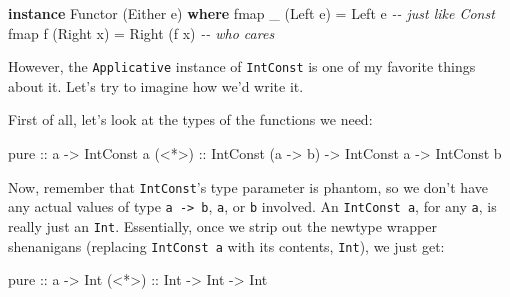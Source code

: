 \documentclass[]{article}
\newenvironment{Shaded}{}{}
\newcommand{\CommentTok}[1]{\textcolor[rgb]{0.38,0.63,0.69}{\textit{#1}}}
\newcommand{\DataTypeTok}[1]{\textcolor[rgb]{0.56,0.13,0.00}{#1}}
\newcommand{\FunctionTok}[1]{\textcolor[rgb]{0.02,0.16,0.49}{#1}}
\newcommand{\KeywordTok}[1]{\textcolor[rgb]{0.00,0.44,0.13}{\textbf{#1}}}
\newcommand{\NormalTok}[1]{#1}
\newcommand{\OtherTok}[1]{\textcolor[rgb]{0.00,0.44,0.13}{#1}}
\begin{document}
\begin{Shaded}
\begin{Highlighting}[]
\KeywordTok{instance} \DataTypeTok{Functor}\NormalTok{ (}\DataTypeTok{Either}\NormalTok{ e) }\KeywordTok{where}
    \FunctionTok{fmap}\NormalTok{ \_ (}\DataTypeTok{Left}\NormalTok{ e)  }\OtherTok{=} \DataTypeTok{Left}\NormalTok{ e        }\CommentTok{{-}{-} just like \textquotesingle{}Const\textquotesingle{}}
    \FunctionTok{fmap}\NormalTok{ f (}\DataTypeTok{Right}\NormalTok{ x) }\OtherTok{=} \DataTypeTok{Right}\NormalTok{ (f x)   }\CommentTok{{-}{-} who cares}
\end{Highlighting}
\end{Shaded}

However, the \texttt{Applicative} instance of \texttt{IntConst} is one of my
favorite things about it. Let's try to imagine how we'd write it.

First of all, let's look at the types of the functions we need:

\begin{Shaded}
\begin{Highlighting}[]
\FunctionTok{pure}\OtherTok{  ::}\NormalTok{ a }\OtherTok{{-}\textgreater{}} \DataTypeTok{IntConst}\NormalTok{ a}
\OtherTok{(\textless{}*\textgreater{}) ::} \DataTypeTok{IntConst}\NormalTok{ (a }\OtherTok{{-}\textgreater{}}\NormalTok{ b) }\OtherTok{{-}\textgreater{}} \DataTypeTok{IntConst}\NormalTok{ a }\OtherTok{{-}\textgreater{}} \DataTypeTok{IntConst}\NormalTok{ b}
\end{Highlighting}
\end{Shaded}

Now, remember that \texttt{IntConst}'s type parameter is phantom, so we don't
have any actual values of type \texttt{a\ -\textgreater{}\ b}, \texttt{a}, or
\texttt{b} involved. An \texttt{IntConst\ a}, for any \texttt{a}, is really just
an \texttt{Int}. Essentially, once we strip out the newtype wrapper shenanigans
(replacing \texttt{IntConst\ a} with its contents, \texttt{Int}), we just get:

\begin{Shaded}
\begin{Highlighting}[]
\FunctionTok{pure}\OtherTok{  ::}\NormalTok{ a }\OtherTok{{-}\textgreater{}} \DataTypeTok{Int}
\OtherTok{(\textless{}*\textgreater{}) ::} \DataTypeTok{Int} \OtherTok{{-}\textgreater{}} \DataTypeTok{Int} \OtherTok{{-}\textgreater{}} \DataTypeTok{Int}
\end{Highlighting}
\end{Shaded}
\end{document}
